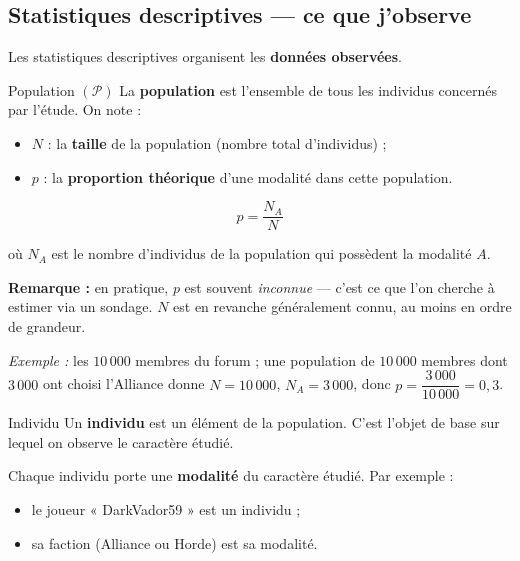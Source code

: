 \documentclass[11pt,a4paper]{article}
\begin{document}
	\subsection{Statistiques descriptives — ce que j'observe}
	
	Les statistiques descriptives organisent les \textbf{données observées}.
	
	\begin{fiche}{Population $\left(\mathcal{P}\right)$}
		La \textbf{population} est l'ensemble de tous les individus concernés par
		l'étude. On note :
		\begin{itemize}
			\item $N$ : la \textbf{taille} de la population (nombre total d'individus) ;
			\item $p$ : la \textbf{proportion théorique} d'une modalité dans cette population.
		\end{itemize}
		\begin{formule}
			\[ p = \dfrac{N_A}{N} \]
		\end{formule}
		où $N_A$ est le nombre d'individus de la population qui possèdent la modalité $A$.
		\begin{notebox}
			\textbf{Remarque :} en pratique, $p$ est souvent \emph{inconnue} — c'est ce que
			l'on cherche à estimer via un sondage. $N$ est en revanche généralement connu,
			au moins en ordre de grandeur.
		\end{notebox}
		\emph{Exemple :} les $10\,000$ membres du forum ; une population de
		$10\,000$ membres dont $3\,000$ ont choisi l'Alliance donne
		$N = 10\,000$, $N_A = 3\,000$, donc $p = \dfrac{3\,000}{10\,000} = 0{,}3$.
	\end{fiche}
	
	\begin{fiche}{Individu}
		Un \textbf{individu} est un élément de la population. C'est l'objet de base sur
		lequel on observe le caractère étudié.
		
		Chaque individu porte une \textbf{modalité} du caractère étudié. Par exemple :
		\begin{itemize}
			\item le joueur « DarkVador59 » est un individu ;
			\item sa faction (Alliance ou Horde) est sa modalité.
		\end{itemize}
	\end{fiche}
	
\end{document}
